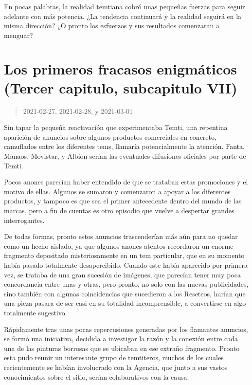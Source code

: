 \documentclass[
  spanish,
]{book}
\begin{document}
En pocas palabras, la realidad temtiana cobró unas pequeñas fuerzas para seguir adelante con más potencia. ¿La tendencia continuará y la realidad seguirá en la misma dirección? ¿O pronto los esfuerzos y sus resultados comenzaran a menguar?

\hypertarget{los-primeros-fracasos-enigmuxe1ticos-tercer-capitulo-subcapitulo-vii}{%
\section{Los primeros fracasos enigmáticos (Tercer capitulo, subcapitulo VII)}\label{los-primeros-fracasos-enigmuxe1ticos-tercer-capitulo-subcapitulo-vii}}

\begin{quote}
2021-02-27, 2021-02-28, y 2021-03-01
\end{quote}

Sin tapar la pequeña reactivación que experimentaba Temti, una repentina aparición de anuncios sobre algunos productos comerciales en concreto, camuflados entre los diferentes tems, llamaría potencialmente la atención. Fanta, Manaos, Movistar, y Albion serían las eventuales difusiones oficiales por parte de Temti.

Pocos anones parecían haber entendido de que se trataban estas promociones y el motivo de ellas. Algunos se sumaron y comenzaron a apoyar a los diferentes productos, y tampoco es que sea el primer antecedente dentro del mundo de las marcas, pero a fin de cuentas es otro episodio que vuelve a despertar grandes interrogantes.

De todas formas, pronto estos anuncios trascenderían más aún para no quedar como un hecho aislado, ya que algunos anones atentos recordaron un enorme fragmento depositado misteriosamente en un tem particular, que en su momento había pasado totalmente desapercibido.
Cuando este había aparecido por primera vez, se trataba de una gran sucesión de imágenes, que parecían tener muy poca concordancia entre unas y otras, pero pronto, no solo con las nuevas publicidades, sino también con algunas coincidencias que sucedieron a los Reseteos, harían que una pieza pasara de ser casi en su totalidad incomprensible, a convertirse en algo totalmente sugestivo.

Rápidamente tras unas pocas repercusiones generadas por los flamantes anuncios, se formó una iniciativa, decidida a investigar la razón y la conexión entre cada una de las pinturas borrosas que se ubicaban en ese extraño fragmento. Pronto esta pudo reunir un interesante grupo de temtiteros, muchos de los cuales recientemente se habían involucrado con la Agencia, que junto a sus vastos conocimientos sobre el sitio, serían colaborativos con la causa.
\end{document}
